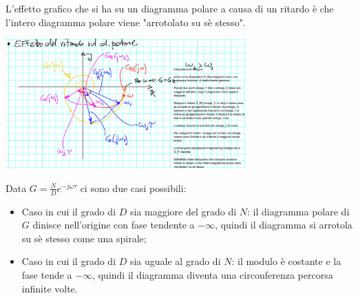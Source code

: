 \begin{itemize}
    \newline
    L'effetto grafico che si ha su un diagramma polare a causa di un ritardo è che l'intero diagramma polare viene "arrotolato su sè stesso".
    \begin{center}
        \includegraphics[height=5cm]{../lezione17/img2.PNG}
    \end{center}
    Data $G = \frac{N}{D} e^{- j \omega \tau}$ ci sono due casi possibili:
    \begin{itemize}
        \item Caso in cui il grado di $D$ sia maggiore del grado di $N$: il diagramma polare di $G$ dinisce nell'origine con fase tendente a $- \infty$, quindi il diagramma si arrotola su sè stesso come una spirale;
        \item Caso in cui il grado di $D$ sia uguale al grado di $N$: il modulo è costante e la fase tende a $- \infty$, quindi il diagramma diventa una circonferenza percorsa infinite volte.
    \end{itemize}
\end{itemize}